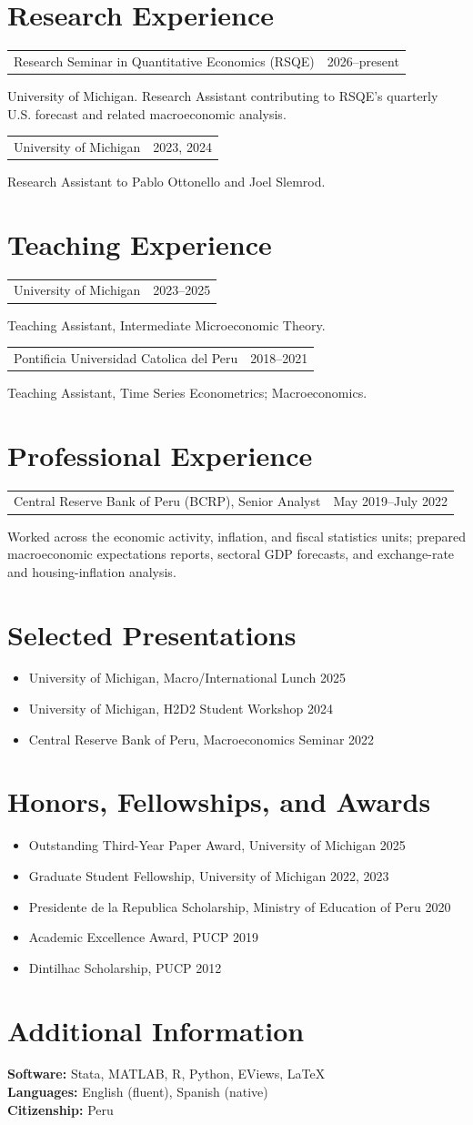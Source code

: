 \documentclass[11pt]{article}
\makeatletter
\newlength{\entryindent}
\newcommand{\datedline}[2]{
  \noindent\hspace*{\entryindent}%
  \begin{tabularx}{\dimexpr\textwidth-\entryindent\relax}{@{}Xr@{}}
    #1 & #2
  \end{tabularx}\par
}
\newcommand{\detail}[1]{
  \noindent\hspace*{\entryindent}%
  \parbox[t]{\dimexpr\textwidth-\entryindent\relax}{\small #1}\par
}
\makeatother
\begin{document}
\section*{Research Experience}
\datedline{Research Seminar in Quantitative Economics (RSQE)}{2026--present}
\detail{University of Michigan. Research Assistant contributing to RSQE's quarterly U.S. forecast and related macroeconomic analysis.}

\datedline{University of Michigan}{2023, 2024}
\detail{Research Assistant to Pablo Ottonello and Joel Slemrod.}

\section*{Teaching Experience}
\datedline{University of Michigan}{2023--2025}
\detail{Teaching Assistant, Intermediate Microeconomic Theory.}

\datedline{Pontificia Universidad Catolica del Peru}{2018--2021}
\detail{Teaching Assistant, Time Series Econometrics; Macroeconomics.}

\section*{Professional Experience}
\datedline{Central Reserve Bank of Peru (BCRP), Senior Analyst}{May 2019--July 2022}
\detail{Worked across the economic activity, inflation, and fiscal statistics units; prepared macroeconomic expectations reports, sectoral GDP forecasts, and exchange-rate and housing-inflation analysis.}

\section*{Selected Presentations}
\begin{itemize}
  \item University of Michigan, Macro/International Lunch \hfill 2025
  \item University of Michigan, H2D2 Student Workshop \hfill 2024
  \item Central Reserve Bank of Peru, Macroeconomics Seminar \hfill 2022
\end{itemize}

\section*{Honors, Fellowships, and Awards}
\begin{itemize}
  \item Outstanding Third-Year Paper Award, University of Michigan \hfill 2025
  \item Graduate Student Fellowship, University of Michigan \hfill 2022, 2023
  \item Presidente de la Republica Scholarship, Ministry of Education of Peru \hfill 2020
  \item Academic Excellence Award, PUCP \hfill 2019
  \item Dintilhac Scholarship, PUCP \hfill 2012
\end{itemize}

\section*{Additional Information}
{\bf Software:} Stata, MATLAB, R, Python, EViews, \LaTeX \\
{\bf Languages:} English (fluent), Spanish (native) \\
{\bf Citizenship:} Peru
\end{document}
